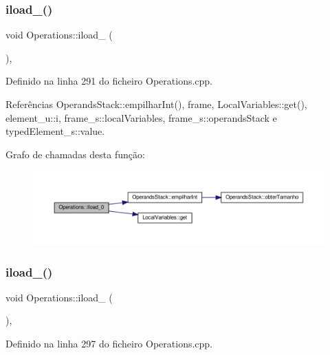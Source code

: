 \subsubsection{\texorpdfstring{iload\+\_()}{iload\_0()}}
{\footnotesize\ttfamily void Operations\+::iload\+\_ (\begin{DoxyParamCaption}{ }\end{DoxyParamCaption})\hspace{0.3cm}{\ttfamily [static]}, {\ttfamily [private]}}



Definido na linha 291 do ficheiro Operations.\+cpp.



Referências Operands\+Stack\+::empilhar\+Int(), frame, Local\+Variables\+::get(), element\+\_\+u\+::i, frame\+\_\+s\+::local\+Variables, frame\+\_\+s\+::operands\+Stack e typed\+Element\+\_\+s\+::value.

Grafo de chamadas desta função\+:\nopagebreak
\begin{figure}[H]
\begin{center}
\leavevmode
\includegraphics[width=350pt]{classOperations_a3aba059cf78681767c141d27989fc2aa_cgraph}
\end{center}
\end{figure}
\mbox{\label{classOperations_a4b9d8ef21894c0db2203c06712e97765}} 
\subsubsection{\texorpdfstring{iload\+\_()}{iload\_1()}}
{\footnotesize\ttfamily void Operations\+::iload\+\_ (\begin{DoxyParamCaption}{ }\end{DoxyParamCaption})\hspace{0.3cm}{\ttfamily [static]}, {\ttfamily [private]}}



Definido na linha 297 do ficheiro Operations.\+cpp.



